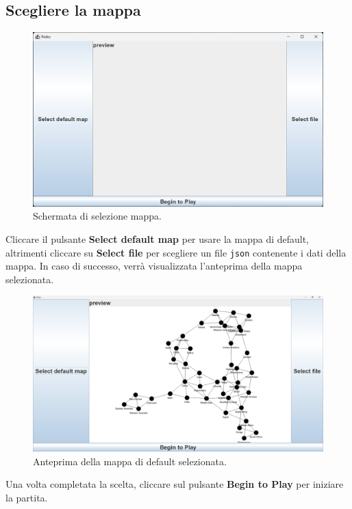 \documentclass[a4paper,12pt]{report}
\begin{document}
\subsection{Scegliere la mappa}
\begin{figure}[H]
	\centering
	\includegraphics[width=1\textwidth]{user_guide/2_select_map_before.png}
	\caption{Schermata di selezione mappa.}
\end{figure}
Cliccare il pulsante \textbf{Select default map} per usare la mappa di default, altrimenti cliccare su \textbf{Select file} per scegliere un file \texttt{json} contenente i dati della mappa.
In caso di successo, verrà visualizzata l'anteprima della mappa selezionata.
\begin{figure}[H]
	\centering
	\includegraphics[width=1\textwidth]{user_guide/3_select_map_after.png}
	\caption{Anteprima della mappa di default selezionata.}
\end{figure}
Una volta completata la scelta, cliccare sul pulsante \textbf{Begin to Play} per iniziare la partita.
\end{document}
